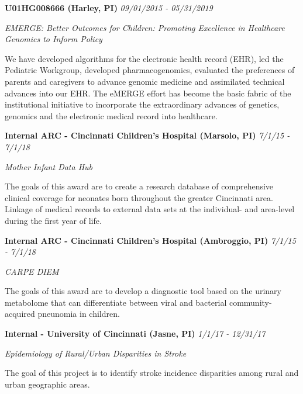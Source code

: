 \documentclass[margin,line]{res}
\newenvironment{list3}{
  \begin{list}{}{%
      \setlength{\itemsep}{0in}
      \setlength{\parsep}{0in} \setlength{\parskip}{0in}
      \setlength{\topsep}{0in} \setlength{\partopsep}{0in} 
      \setlength{\leftmargin}{0in}}}{\end{list}}
\begin{document}
\begin{resume}
\begin{list3} \itemsep 4pt
    \item[] \textbf{U01HG008666 (Harley, PI)} \hfill \textit{09/01/2015 - 05/31/2019}
\item[] \textit{EMERGE: Better Outcomes for Children: Promoting Excellence in Healthcare Genomics to Inform Policy}
\item[] We have developed algorithms for the electronic health record (EHR), led the Pediatric Workgroup, developed pharmacogenomics, evaluated the preferences of parents and caregivers to advance genomic medicine and assimilated technical advances into our EHR. The eMERGE effort has become the basic fabric of the institutional initiative to incorporate the extraordinary advances of genetics, genomics and the electronic
medical record into healthcare.
\end{list3}

\vspace*{.1in}

\begin{list3} \itemsep 4pt
    \item[] \textbf{Internal ARC - Cincinnati Children's Hospital (Marsolo, PI)} \hfill \textit{7/1/15 - 7/1/18}
\item[] \textit{Mother Infant Data Hub}
\item[] The goals of this award are to create a research database of comprehensive clinical coverage for neonates born throughout the greater Cincinnati area. Linkage of medical records to external data sets at the individual- and area-level during the first year of life.
\end{list3}

\vspace*{.1in}

\begin{list3} \itemsep 4pt
    \item[] \textbf{Internal ARC - Cincinnati Children's Hospital (Ambroggio, PI)} \hfill \textit{7/1/15 - 7/1/18}
\item[] \textit{CARPE DIEM}
\item[] The goals of this award are to develop a diagnostic tool based on the urinary metabolome that can differentiate between viral and bacterial community-acquired pneunomia in children.
\end{list3}

\vspace*{.1in}


\begin{list3} \itemsep 4pt
    \item[] \textbf{Internal - University of Cincinnati (Jasne, PI)} \hfill \textit{1/1/17 - 12/31/17}
\item[] \textit{Epidemiology of Rural/Urban Disparities in Stroke}
\item[] The goal of this project is to identify stroke incidence disparities among rural and urban geographic areas.
\end{list3}


\end{resume}
\end{document}
